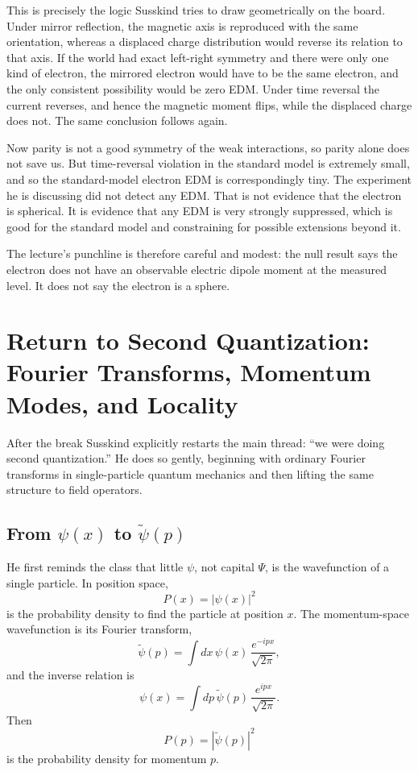 This is precisely the logic Susskind tries to draw geometrically on the board. Under mirror reflection, the magnetic axis is reproduced with the same orientation, whereas a displaced charge distribution would reverse its relation to that axis. If the world had exact left-right symmetry and there were only one kind of electron, the mirrored electron would have to be the same electron, and the only consistent possibility would be zero EDM. Under time reversal the current reverses, and hence the magnetic moment flips, while the displaced charge does not. The same conclusion follows again.

Now parity is not a good symmetry of the weak interactions, so parity alone does not save us. But time-reversal violation in the standard model is extremely small, and so the standard-model electron EDM is correspondingly tiny. The experiment he is discussing did not detect any EDM. That is not evidence that the electron is spherical. It is evidence that any EDM is very strongly suppressed, which is good for the standard model and constraining for possible extensions beyond it.

The lecture's punchline is therefore careful and modest: the null result says the electron does not have an observable electric dipole moment at the measured level. It does not say the electron is a sphere.

\section{Return to Second Quantization: Fourier Transforms, Momentum Modes, and Locality}

After the break Susskind explicitly restarts the main thread: ``we were doing second quantization.'' He does so gently, beginning with ordinary Fourier transforms in single-particle quantum mechanics and then lifting the same structure to field operators.

\subsection{From \(\psi(x)\) to \(\tilde{\psi}(p)\)}

He first reminds the class that little \(\psi\), not capital \(\Psi\), is the wavefunction of a single particle. In position space,
\begin{equation}
P(x)=|\psi(x)|^2
\end{equation}
is the probability density to find the particle at position \(x\). The momentum-space wavefunction is its Fourier transform,
\begin{equation}
\tilde{\psi}(p)=\int dx\,\psi(x)\,\frac{e^{-ipx}}{\sqrt{2\pi}},
\end{equation}
and the inverse relation is
\begin{equation}
\psi(x)=\int dp\,\tilde{\psi}(p)\,\frac{e^{ipx}}{\sqrt{2\pi}}.
\end{equation}
Then
\begin{equation}
P(p)=|\tilde{\psi}(p)|^2
\end{equation}
is the probability density for momentum \(p\).

